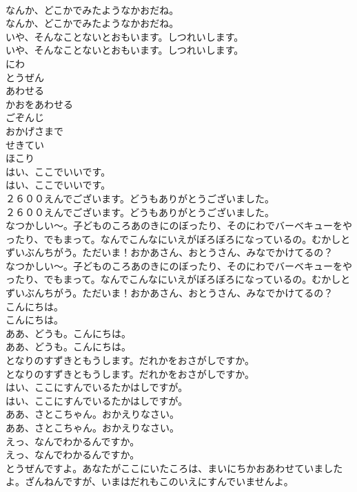 \documentclass[8pt]{extreport}
\begin{document}
\begin{CJK}{UTF8}{min}
\\	なんか、どこかでみたようなかおだね。	
\\	なんか、どこかでみたようなかおだね。 
\\	いや、そんなことないとおもいます。しつれいします。	
\\	いや、そんなことないとおもいます。しつれいします。 
\\	にわ
\\	とうぜん
\\	あわせる
\\	かおをあわせる
\\	ごぞんじ
\\	おかげさまで
\\	せきてい
\\	ほこり
\\	はい、ここでいいです。	
\\	はい、ここでいいです。 
\\	２６００えんでございます。どうもありがとうございました。	
\\	２６００えんでございます。どうもありがとうございました。 
\\	なつかしい〜。子どものころあのきにのぼったり、そのにわでバーベキューをやったり、でもまって。なんでこんなにいえがぼろぼろになっているの。むかしとずいぶんちがう。ただいま！おかあさん、おとうさん、みなでかけてるの？	
\\	なつかしい〜。子どものころあのきにのぼったり、そのにわでバーベキューをやったり、でもまって。なんでこんなにいえがぼろぼろになっているの。むかしとずいぶんちがう。ただいま！おかあさん、おとうさん、みなでかけてるの？ 
\\	こんにちは。	
\\	こんにちは。 
\\	ああ、どうも。こんにちは。	
\\	ああ、どうも。こんにちは。 
\\	となりのすずきともうします。だれかをおさがしですか。	
\\	となりのすずきともうします。だれかをおさがしですか。 
\\	はい、ここにすんでいるたかはしですが。	
\\	はい、ここにすんでいるたかはしですが。 
\\	ああ、さとこちゃん。おかえりなさい。	
\\	ああ、さとこちゃん。おかえりなさい。 
\\	えっ、なんでわかるんですか。	
\\	えっ、なんでわかるんですか。 
\\	とうぜんですよ。あなたがここにいたころは、まいにちかおあわせていましたよ。ざんねんですが、いまはだれもこのいえにすんでいませんよ。	

\end{CJK}
\end{document}
